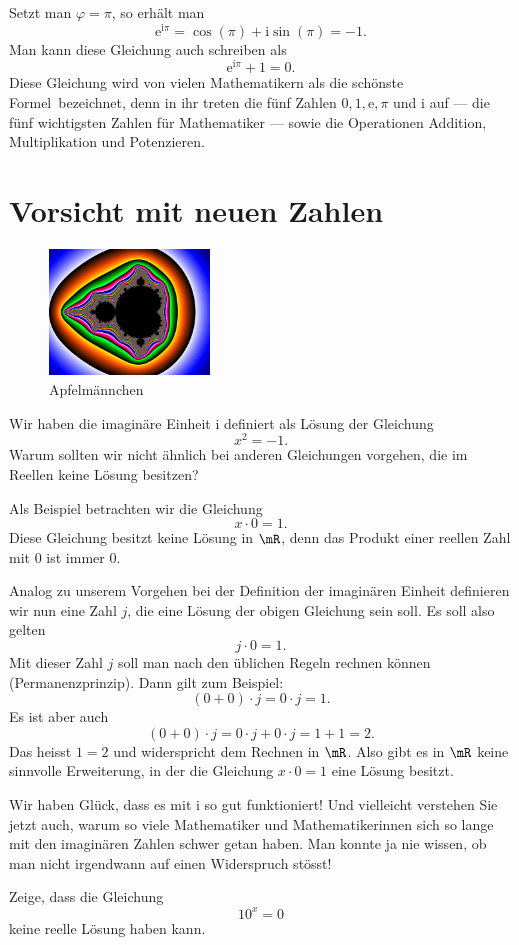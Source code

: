 \documentclass[%
11pt,%
twoside,%
titlepage,%
german,%
headsepline%
]{scrartcl}
\begin{document}
\begin{bem}
Setzt man $\varphi = \pi$, so erhält man
$$\mathrm{e}^{\mathrm{i}\pi}=\cos(\pi)+\mathrm{i}\sin(\pi)=-1.$$
Man kann diese Gleichung auch schreiben als
$$\mathrm{e}^{\mathrm{i}\pi}+1=0.$$
Diese Gleichung wird von vielen Mathematikern als \glqq die sch\"onste
Formel\grqq\ bezeichnet, denn in ihr treten die f\"unf Zahlen $0, 1, \mathrm{e}, \pi$ und $\mathrm{i}$ auf --- die f\"unf wichtigsten Zahlen f\"ur Mathematiker --- sowie die Operationen Addition, Multiplikation und Potenzieren.
\end{bem}

\section{Vorsicht mit neuen Zahlen}
\begin{figure}
\vspace{-5pt}
  \begin{center}
    \includegraphics[width=0.38\textwidth]{pictures/apfel}
  \end{center}
\caption{Apfelmännchen}
\vspace{10pt}
\end{figure}
Wir haben die imaginäre Einheit $\mathrm{i}$ definiert als L\"osung der Gleichung
$$x^2 = -1.$$
Warum sollten wir nicht ähnlich bei anderen Gleichungen vorgehen, die im Reellen keine L\"osung besitzen?
\begin{bsp}
Als Beispiel betrachten wir die Gleichung
$$x \cdot 0 = 1.$$
Diese Gleichung besitzt keine L\"osung in $\mR$, denn das Produkt einer reellen Zahl mit $0$ ist immer $0$.

Analog zu unserem Vorgehen bei der Definition der imaginären Einheit definieren wir nun eine Zahl $j$, die eine L\"osung der obigen Gleichung sein soll. Es soll also gelten
$$j\cdot 0=1.$$
Mit dieser Zahl $j$ soll man nach den \"ublichen Regeln rechnen k\"onnen (Permanenzprinzip). Dann gilt zum Beispiel:
$$(0+0)\cdot j=0\cdot j=1.$$
Es ist aber auch
$$(0+0)\cdot j=0\cdot j+0\cdot j=1+1=2.$$
Das heisst $1=2$ und widerspricht dem Rechnen in $\mR$. Also gibt es in $\mR$ keine sinnvolle Erweiterung, in der die Gleichung $x\cdot0=1$ eine L\"osung besitzt.
\end{bsp}
Wir haben Gl\"uck, dass es mit $\mathrm{i}$ so gut funktioniert! Und vielleicht verstehen Sie jetzt auch, warum so viele Mathematiker und Mathematikerinnen sich so lange mit den imaginären Zahlen schwer getan haben. Man konnte ja nie wissen, ob man nicht irgendwann auf einen Widerspruch st\"osst!
\begin{ueb}[gleich $0$]
Zeige, dass die Gleichung
$$10^x=0$$
keine reelle L\"osung haben kann.
\end{ueb}
\end{document}
